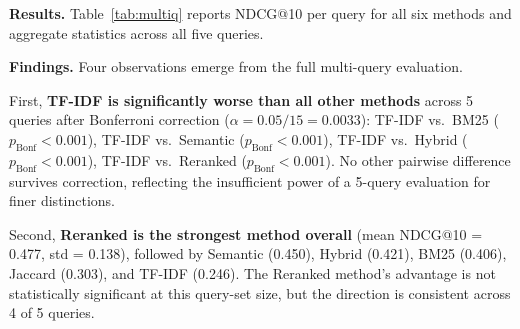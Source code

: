 \documentclass[11pt,a4paper]{article}
\begin{document}
\textbf{Results.}
Table~\ref{tab:multiq} reports NDCG@10 per query for all six methods
and aggregate statistics across all five queries.

\begin{table}[H]
\centering
\caption{NDCG@10 across 5 queries, all six retrieval methods.
Semantic, Hybrid, and Reranked scores for Q2--Q5 computed with
\texttt{all-MiniLM-L6-v2} via \texttt{analysis/embed\_queries.py}.}
\label{tab:multiq}
\end{table}

\textbf{Findings.}
Four observations emerge from the full multi-query evaluation.

First, \textbf{TF-IDF is significantly worse than all other methods}
across 5 queries after Bonferroni correction ($\alpha = 0.05/15 = 0.0033$):
TF-IDF vs.\ BM25 ($p_{\text{Bonf}} < 0.001$),
TF-IDF vs.\ Semantic ($p_{\text{Bonf}} < 0.001$),
TF-IDF vs.\ Hybrid ($p_{\text{Bonf}} < 0.001$),
TF-IDF vs.\ Reranked ($p_{\text{Bonf}} < 0.001$).
No other pairwise difference survives correction, reflecting the
insufficient power of a 5-query evaluation for finer distinctions.

Second, \textbf{Reranked is the strongest method overall}
(mean NDCG@10 = 0.477, std = 0.138), followed by Semantic (0.450),
Hybrid (0.421), BM25 (0.406), Jaccard (0.303), and TF-IDF (0.246).
The Reranked method's advantage is not statistically significant
at this query-set size, but the direction is consistent across 4 of 5 queries.
\end{document}

